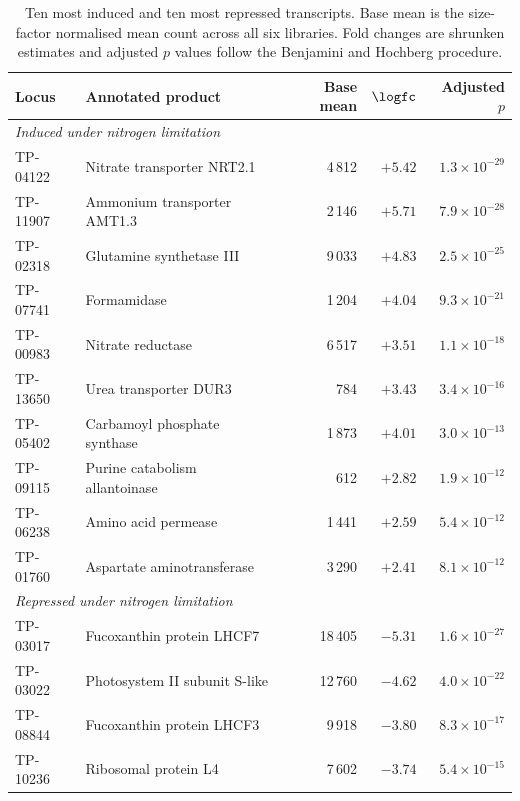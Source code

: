 \begin{table}[t]
  \centering
  \small
  \caption{Ten most induced and ten most repressed transcripts. Base mean is
  the size-factor normalised mean count across all six libraries. Fold changes
  are shrunken estimates and adjusted $p$ values follow the Benjamini and
  Hochberg procedure.}
  \label{tab:de}
  \begin{tabular}{llrrr}
    \toprule
    Locus & Annotated product & Base mean & $\logfc$ & Adjusted $p$ \\
    \midrule
    \multicolumn{5}{l}{\emph{Induced under nitrogen limitation}} \\
    TP-04122 & Nitrate transporter NRT2.1        & 4\,812 & $+5.42$ & $1.3 \times 10^{-29}$ \\
    TP-11907 & Ammonium transporter AMT1.3       & 2\,146 & $+5.71$ & $7.9 \times 10^{-28}$ \\
    TP-02318 & Glutamine synthetase III          & 9\,033 & $+4.83$ & $2.5 \times 10^{-25}$ \\
    TP-07741 & Formamidase                       & 1\,204 & $+4.04$ & $9.3 \times 10^{-21}$ \\
    TP-00983 & Nitrate reductase                 & 6\,517 & $+3.51$ & $1.1 \times 10^{-18}$ \\
    TP-13650 & Urea transporter DUR3             &   784 & $+3.43$ & $3.4 \times 10^{-16}$ \\
    TP-05402 & Carbamoyl phosphate synthase      & 1\,873 & $+4.01$ & $3.0 \times 10^{-13}$ \\
    TP-09115 & Purine catabolism allantoinase    &   612 & $+2.82$ & $1.9 \times 10^{-12}$ \\
    TP-06238 & Amino acid permease               & 1\,441 & $+2.59$ & $5.4 \times 10^{-12}$ \\
    TP-01760 & Aspartate aminotransferase        & 3\,290 & $+2.41$ & $8.1 \times 10^{-12}$ \\
    \midrule
    \multicolumn{5}{l}{\emph{Repressed under nitrogen limitation}} \\
    TP-03017 & Fucoxanthin protein LHCF7         & 18\,405 & $-5.31$ & $1.6 \times 10^{-27}$ \\
    TP-03022 & Photosystem II subunit S-like     & 12\,760 & $-4.62$ & $4.0 \times 10^{-22}$ \\
    TP-08844 & Fucoxanthin protein LHCF3         &  9\,918 & $-3.80$ & $8.3 \times 10^{-17}$ \\
    TP-10236 & Ribosomal protein L4              &  7\,602 & $-3.74$ & $5.4 \times 10^{-15}$ \\

\end{tabular}
\end{table}
